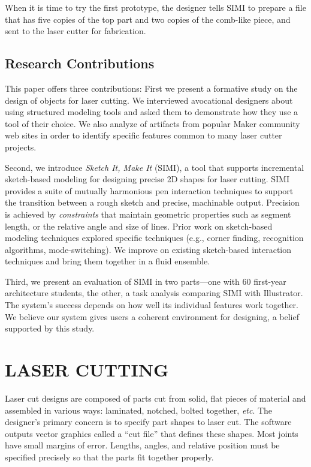 \documentclass{article}
\begin{document}
When it is time to try the first prototype, the designer tells SIMI to
prepare a file that has five copies of the top part and two copies of
the comb-like piece, and sent to the laser cutter for fabrication.

\subsection{Research Contributions}

This paper offers three contributions: First we present a formative
study on the design of objects for laser cutting. We interviewed
avocational designers about using structured modeling tools and asked
them to demonstrate how they use a tool of their choice. We also
analyze of artifacts from popular Maker community web sites in order
to identify specific features common to many laser cutter projects.

Second, we introduce \textit{Sketch It, Make It} (SIMI), a tool that
supports incremental sketch-based modeling for designing precise 2D
shapes for laser cutting. SIMI provides a suite of mutually harmonious
pen interaction techniques to support the transition between a rough
sketch and precise, machinable output. Precision is achieved by
\textit{constraints} that maintain geometric properties such as
segment length, or the relative angle and size of lines. Prior work on
sketch-based modeling techniques explored specific techniques (e.g.,
corner finding, recognition algorithms, mode-switching). We improve on
existing sketch-based interaction techniques and bring them together
in a fluid ensemble.

Third, we present an evaluation of SIMI in two parts---one with 60
first-year architecture students, the other, a task analysis comparing
SIMI with Illustrator. The system's success depends on how well its
individual features work together. We believe our system gives users a
coherent environment for designing, a belief supported by this study.

\section{LASER CUTTING}

Laser cut designs are composed of parts cut from solid, flat pieces of
material and assembled in various ways: laminated, notched, bolted
together, \textit{etc}. The designer's primary concern is to specify
part shapes to laser cut. The software outputs vector graphics called
a ``cut file'' that defines these shapes. Most joints have small
margins of error. Lengths, angles, and relative position must be
specified precisely so that the parts fit together properly.
\end{document}
